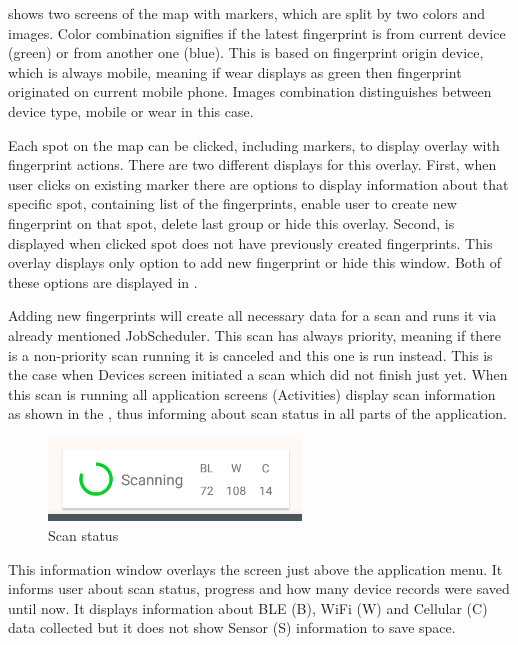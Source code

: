  shows two screens of the map with markers, which are split by two colors and images. Color combination signifies if the latest fingerprint is from current device (green) or from another one (blue). This is based on fingerprint origin device, which is always mobile, meaning if wear displays as green then fingerprint originated on current mobile phone. Images combination distinguishes between device type, mobile or wear in this case.

Each spot on the map can be clicked, including markers, to display overlay with fingerprint actions. There are two different displays for this overlay. First, when user clicks on existing marker there are options to display information about that specific spot, containing list of the fingerprints, enable user to create new fingerprint on that spot, delete last group or hide this overlay. Second, is displayed when clicked spot does not have previously created fingerprints. This overlay displays only option to add new fingerprint or hide this window. Both of these options are displayed in .

Adding new fingerprints will create all necessary data for a scan and runs it via already mentioned JobScheduler. This scan has always priority, meaning if there is a non-priority scan running it is canceled and this one is run instead. This is the case when Devices screen initiated a scan which did not finish just yet. When this scan is running all application screens (Activities) display scan information as shown in the , thus informing about scan status in all parts of the application.

\begin{figure}[H]
	\begin{centering}
		\includegraphics[width=0.6\textwidth]{img/scan_status}
		\par\end{centering}
	\caption{Scan status}
	\label{fig05c05}
\end{figure}

This information window overlays the screen just above the application menu. It informs user about scan status, progress and how many device records were saved until now. It displays information about BLE (B), WiFi (W) and Cellular (C) data collected but it does not show Sensor (S) information to save space.

